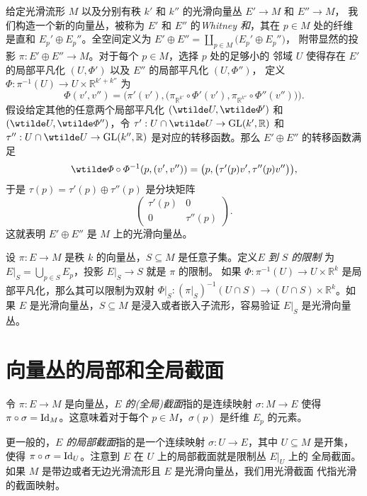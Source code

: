 \begin{example}[Whitney 和]
  给定光滑流形 $M$ 以及分别有秩 $k'$ 和 $k''$ 的光滑向量丛 $E'\to M$ 和 $E''\to M$，
  我们构造一个新的向量丛，被称为 $E'$ 和 $E''$ 的\emph{Whitney 和}，其在 $p\in M$
  处的纤维是直和 $E_p'\oplus E_p''$。全空间定义为 $E'\oplus E''=\coprod_{p\in M}\bigl(E_p'\oplus E_p''\bigr)$，
  附带显然的投影 $\pi:E'\oplus E''\to M$。对于每个 $p\in M$，选择 $p$ 处的足够小的
  邻域 $U$ 使得存在 $E'$ 的局部平凡化 $(U,\varPhi')$ 以及 $E''$ 的局部平凡化 $(U,\varPhi'')$，
  定义 $\varPhi:\pi^{-1}(U)\to U\times \mathbb{R}^{k'+k''}$ 为
  \[
    \varPhi(v',v'')=\bigl(\pi'(v'),\bigl(\pi_{\mathbb{R}^{k'}}\circ\varPhi'(v'),\pi_{\mathbb{R}^{k''}}\circ\varPhi''(v'')\bigr)\bigr).
  \]
  假设给定其他的任意两个局部平凡化 $\left(\wtilde U,\wtilde\varPhi'\right)$ 和
  $\left(\wtilde U,\wtilde\varPhi''\right)$，令 $\tau':U\cap\wtilde U\to \GL(k',\mathbb{R})$
  和 $\tau'':U\cap\wtilde U\to \GL(k'',\mathbb{R})$ 是对应的转移函数。那么
  $E'\oplus E''$ 的转移函数满足
  \[
    \wtilde\varPhi\circ\varPhi^{-1}(p,(v',v''))=\bigl(p,\bigl(\tau'(p)v',\tau''(p)v''\bigr)\bigr),
  \]
  于是 $\tau(p)=\tau'(p)\oplus\tau''(p)$ 是分块矩阵
  \[
    \begin{pmatrix}
      \tau'(p) & 0 \\
      0 & \tau''(p)
    \end{pmatrix}.
  \]
  这就表明 $E'\oplus E''$ 是 $M$ 上的光滑向量丛。 
\end{example}

\begin{example}[向量丛的限制]
  设 $\pi:E\to M$ 是秩 $k$ 的向量丛，$S\subseteq M$ 是任意子集。定义\emph{$E$ 到 $S$ 的限制}
  为 $E|_S=\bigcup_{p\in S}E_p$，投影 $E|_S\to S$ 就是 $\pi$ 的限制。
  如果 $\varPhi:\pi^{-1}(U)\to U\times \mathbb{R}^k$ 是局部平凡化，那么其可以限制为双射
  $\varPhi|_S:(\pi|_S)^{-1}(U\cap S)\to (U\cap S)\times \mathbb{R}^k$。如果 $E$
  是光滑向量丛，$S\subseteq M$ 是浸入或者嵌入子流形，容易验证 $E|_S$ 是光滑向量丛。
\end{example}

\section{向量丛的局部和全局截面}

令 $\pi:E\to M$ 是向量丛，\emph{$E$ 的(全局)截面}指的是连续映射 $\sigma:M\to E$ 使得
$\pi\circ\sigma=\operatorname{Id}_M$。这意味着对于每个 $p\in M$，$\sigma(p)$ 是纤维 $E_p$ 的元素。

更一般的，\emph{$E$ 的局部截面}指的是一个连续映射 $\sigma:U\to E$，其中 $U\subseteq M$ 是开集，
使得 $\pi\circ\sigma=\operatorname{Id}_U$。注意到 $E$ 在 $U$ 上的局部截面就是限制丛 $E|_U$ 上的
全局截面。如果 $M$ 是带边或者无边光滑流形且 $E$ 是光滑向量丛，我们用光滑截面
代指光滑的截面映射。

